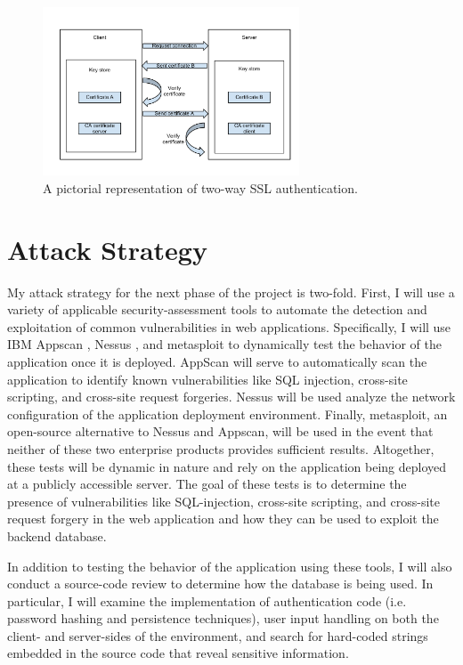 \documentclass{sig-alternate}
\begin{document}
\begin{figure}[ht!]
\begin{center}
\includegraphics[width=3in]{images/two_way_ssl.pdf}
\caption{A pictorial representation of two-way SSL authentication.}
\label{fig:ssl}
\end{center}
\end{figure}

\section{Attack Strategy}
\label{sec:attack}

My attack strategy for the next phase of the project is two-fold. First, I will use a variety of applicable security-assessment 
tools to automate the detection and exploitation of common vulnerabilities in web applications. 
Specifically, I will use IBM Appscan \cite{_ibm_appscan}, Nessus \cite{_nessus}, and metasploit \cite{_penetration_metasploit} to dynamically test the behavior
of the application once it is deployed. AppScan will serve to automatically scan the application to identify
known vulnerabilities like SQL injection, cross-site scripting, and cross-site request forgeries. Nessus will be used
analyze the network configuration of the application deployment environment. Finally, metasploit, an open-source
alternative to Nessus and Appscan, will be used in the event that neither of these two enterprise products provides
sufficient results. Altogether, these tests will be dynamic in nature and rely on the application being deployed at a publicly
accessible server. The goal of these tests is to determine the presence of vulnerabilities like SQL-injection, cross-site
scripting, and cross-site request forgery in the web application and how they can be used to exploit the backend
database. 

In addition to testing the behavior of the application using these tools, I will also conduct a source-code review 
to determine how the database is being used. In particular, I will examine the implementation of authentication code
(i.e. password hashing and persistence techniques), user input handling on both the client- and server-sides of
the environment, and search for hard-coded strings embedded in the source code that reveal sensitive information.
\end{document}
